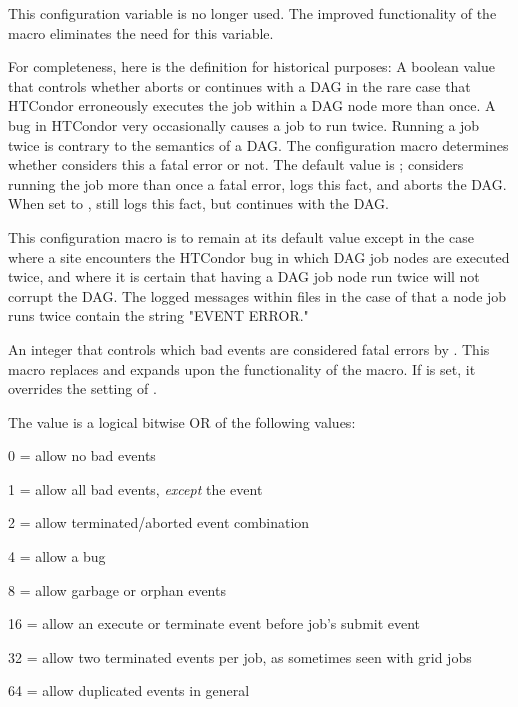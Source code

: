 \begin{description}
\label{param:DAGManIgnoreDuplicateJobExecution}
\item[\Macro{DAGMAN\_IGNORE\_DUPLICATE\_JOB\_EXECUTION}]
  This configuration variable is no longer used. The improved functionality
  of the  macro eliminates the
  need for this variable.

  For completeness, here is the definition for historical purposes: 
  A boolean value that controls
  whether  aborts or continues with a DAG
  in the rare case that HTCondor erroneously executes
  the job within a DAG node more than once.
  A bug in HTCondor very occasionally causes a job to run twice.
  Running a job twice is contrary to the semantics of a DAG.
  The configuration macro 
  determines whether   considers this a fatal error or not.
  The default value is ;  considers
  running the job more than once a fatal error, 
  logs this fact,
  and aborts the DAG.
  When set to ,  still
  logs this fact,
  but continues with the DAG. 

  This configuration macro is to remain at its default value 
  except in the case
  where a site encounters the HTCondor bug in which DAG job nodes
  are executed twice,
  and where it is certain
  that having a DAG job node run twice will not corrupt the DAG.
  The logged messages within  files
  in the case of that a node job runs twice
  contain the string
  "EVENT ERROR."

\label{param:DAGManAllowEvents}
\item[\Macro{DAGMAN\_ALLOW\_EVENTS}]
  An integer that controls which bad events are considered
  fatal errors by .  This macro replaces and expands
  upon the functionality of the
   macro.
  If  is set, it overrides the
  setting of .

  The  value is a logical bitwise OR of the
  following values:
  \begin{description}
  \item 0 = allow no bad events
  \item 1 = allow all bad events, \emph{except} the event
  \item 2 = allow terminated/aborted event combination
  \item 4 = allow a  bug
  \item 8 = allow garbage or orphan events
  \item 16 = allow an execute or terminate event before job's submit event
  \item 32 = allow two terminated events per job, as sometimes seen
    with grid jobs
  \item 64 = allow duplicated events in general
  \end{description}


\end{description}
